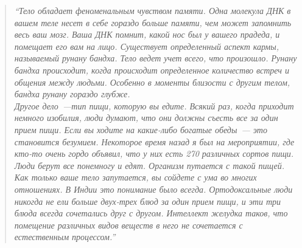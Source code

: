 \begin{quote}
\textit{``Тело обладает феноменальным чувством памяти. Одна молекула ДНК в вашем теле несет в себе гораздо больше памяти, чем может запомнить весь ваш мозг. Ваша ДНК помнит, какой нос был у вашего прадеда, и помещает его вам на лицо. Существует определенный аспект кармы, называемый рунану бандха. Тело ведет учет всего, что произошло. Рунану бандха происходит, когда происходит определенное количество встреч и общения между людьми. Особенно в моменты близости с другим телом, бандха рунану гораздо глубже.
\\[3pt]
Другое дело~---тип пищи, которую вы едите. Всякий раз, когда приходит немного изобилия, люди думают, что они должны съесть все за один прием пищи. Если вы ходите на какие-либо богатые обеды~--- это становится безумием. Некоторое время назад я был на мероприятии, где кто-то очень гордо объявил, что у них есть 270 различных сортов пищи. Люди берут все понемногу и едят. Организм путается с такой пищей. Как только ваше тело запутается, вы сойдете с ума во многих отношениях. В Индии это понимание было всегда. Ортодоксальные люди никогда не ели больше двух-трех блюд за один прием пищи, и эти три блюда всегда сочетались друг с другом. Интеллект желудка таков, что помещение различных видов веществ в него не сочетается с естественным процессом.''
\\[5pt]
}
\end{quote}
